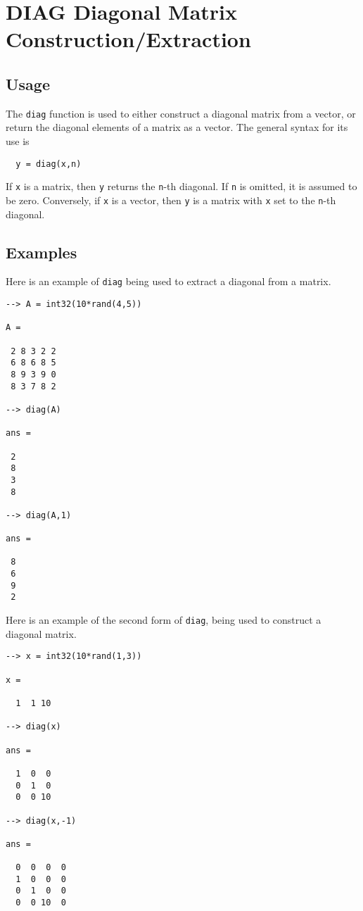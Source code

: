 \section{DIAG Diagonal Matrix Construction/Extraction}

\subsection{Usage}

The \verb|diag| function is used to either construct a 
diagonal matrix from a vector, or return the diagonal
elements of a matrix as a vector.  The general syntax
for its use is
\begin{verbatim}
  y = diag(x,n)
\end{verbatim}
If \verb|x| is a matrix, then \verb|y| returns the \verb|n|-th 
diagonal.  If \verb|n| is omitted, it is assumed to be
zero.  Conversely, if \verb|x| is a vector, then \verb|y|
is a matrix with \verb|x| set to the \verb|n|-th diagonal.
\subsection{Examples}

Here is an example of \verb|diag| being used to extract
a diagonal from a matrix.
\begin{verbatim}
--> A = int32(10*rand(4,5))

A = 

 2 8 3 2 2 
 6 8 6 8 5 
 8 9 3 9 0 
 8 3 7 8 2 

--> diag(A)

ans = 

 2 
 8 
 3 
 8 

--> diag(A,1)

ans = 

 8 
 6 
 9 
 2 
\end{verbatim}
Here is an example of the second form of \verb|diag|, being
used to construct a diagonal matrix.
\begin{verbatim}
--> x = int32(10*rand(1,3))

x = 

  1  1 10 

--> diag(x)

ans = 

  1  0  0 
  0  1  0 
  0  0 10 

--> diag(x,-1)

ans = 

  0  0  0  0 
  1  0  0  0 
  0  1  0  0 
  0  0 10  0 
\end{verbatim}
